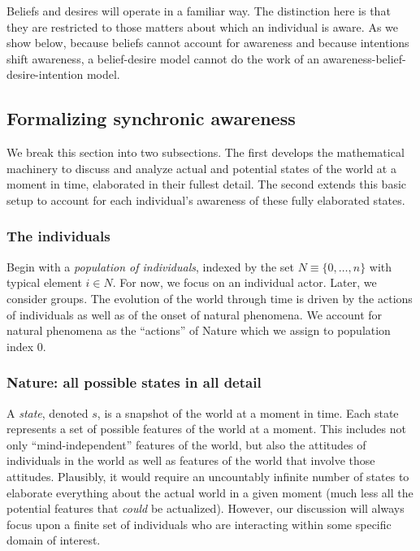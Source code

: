 \documentclass[
11pt,
titlepage,
reqno,
]{article}%
\theoremstyle{definition}
\begin{document}
Beliefs and desires will operate in a familiar way. 
The distinction here is that they are restricted to those matters about which an individual is aware.
As we show below, because beliefs cannot account for awareness and because intentions shift awareness, a belief-desire model cannot do the work of an awareness-belief-desire-intention model.


	
\subsection{Formalizing synchronic awareness}\label{sec:synchronic_setup}
We break this section into two subsections. The first develops the mathematical machinery to discuss and analyze actual and  potential states of the world at a moment in time, elaborated in their fullest detail. The second extends this basic setup to account for each individual's awareness of these fully elaborated states.  
	
\subsubsection{The individuals}\label{sec:individuals}
Begin with a \textit{population of individuals}, indexed by the set $N\equiv \{0,\ldots,n\}$ with typical element $i\in N$. For now, we focus on an individual actor. 
Later, we consider groups. The evolution of the world through time is driven by the actions of individuals as well as of the onset of natural phenomena. 
We account for natural phenomena as the ``actions'' of  Nature which we assign to population index 0.


\subsubsection{Nature: all possible states in all detail\label{sec:states}}
A \textit{state}, denoted $s$, is a snapshot of the world at a moment in time.
Each state represents a set of possible features of the world at a moment. 
This includes not only ``mind-independent'' features of the world, but also the attitudes of individuals in the world as well as features of the world that involve those attitudes. 
Plausibly, it would require an uncountably infinite number of states to elaborate everything about the actual world in a given moment (much less all the potential features that \textit{could} be actualized).
However, our discussion will always focus upon a finite set of individuals who are interacting within some specific domain of interest.
	
\end{document}
